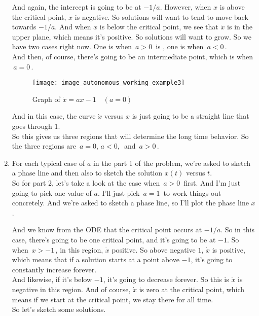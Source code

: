 \begin{enumerate}
  And again, the intercept is going to be at $-1/a$. 
  However, when $x$ is above the critical point, $\dot x$  is negative.
  So solutions will want to tend to move back towards $-1/a$.
  And when $x$ is below the critical point, we see that $\dot x$ is in the upper plane, which
  means it's positive. So solutions will want to grow.
  So we have two cases right now. 
  One is when $\, a > 0\,$ is , one is when $\, a < 0 \,$.\\

  And then, of course, there's going to be an intermediate point,
  which is when $\, a = 0 \,$.

  \begin{figure}[ht!]
    \centering
    \texttt{[image: image\_autonomous\_working\_example3]}
    \caption{Graph of $\dot x = ax -1 \quad (a = 0)$}
  \end{figure}
  
  And in this case, the curve $\dot x$ versus $x$ is just going to
  be a straight line that goes through $1$. \\

  So this gives us three regions that will determine the long time behavior.
  So the three regions are $\, a = 0,\,  a < 0, \,$ and $\, a > 0\,$. 

\item For each typical case of $a$ in the part 1 of the problem,
  we're asked to sketch a phase line and then also to sketch the solution $x(t)$ versus $t$.\\
  
  So for part 2, let's take a look at the case when $\,  a > 0\, $ first.
  And I'm just going to pick one value of $a$.
  I'll just pick $\,a = 1 \,$ to work things out concretely.
  And we're asked to sketch a phase line, so I'll plot the phase line $x$.

  And we know from the ODE that the critical point occurs at $-1/a$.
  So in this case, there's going to be one critical point,
  and it's going to be at $-1$.
  So when $\, x  > -1 \,$, in this region,  $\dot x$ positive.
  So above negative $1$, $\dot x$ is positive,
  which means that if a solution starts at a point above
  $-1$, it's going to constantly increase forever.\\ 
  And likewise, if it's below $-1$, it's going to decrease forever.
  So this is $\dot x$ is negative in this region.
  And of course, $\dot x$ is zero at the critical point, which
  means if we start at the critical point, we stay there for all time. \\
  So let's sketch some solutions.


\end{enumerate}
